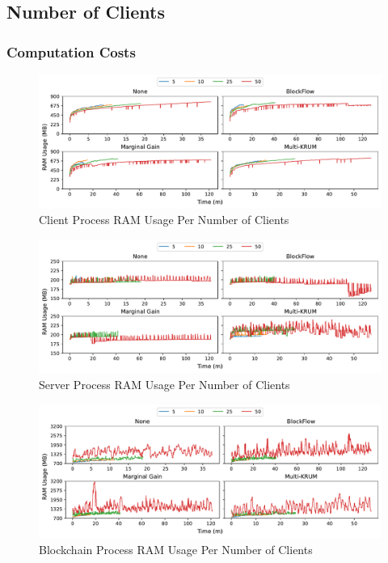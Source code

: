 \subsection{Number of Clients}

\subsubsection{Computation Costs}

\begin{figure}[!h]
    \centering
    \includegraphics[width=\textwidth]{graphics/clients/ram_client.pdf}
    \caption{Client Process RAM Usage Per Number of Clients}
    \label{fig:ram_clients_clients}
\end{figure}

\begin{figure}[!h]
    \centering
    \includegraphics[width=\textwidth]{graphics/clients/ram_server.pdf}
    \caption{Server Process RAM Usage Per Number of Clients}
    \label{fig:ram_clients_servers}
\end{figure}

\begin{figure}[!h]
    \centering
    \includegraphics[width=\textwidth]{graphics/clients/ram_miner.pdf}
    \caption{Blockchain Process RAM Usage Per Number of Clients}
    \label{fig:ram_clients_miners}
\end{figure}

